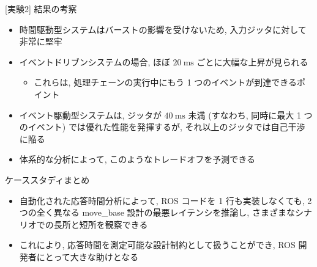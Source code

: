 \begin{frame}{[実験2] 結果の考察}
    \begin{itemize}
        \item 時間駆動型システムはバーストの影響を受けないため, 入力ジッタに対して非常に堅牢
        \item イベントドリブンシステムの場合, ほぼ $20 \mathrm{~ms}$ ごとに大幅な上昇が見られる
              \begin{itemize}
                  \item これらは, 処理チェーンの実行中にもう 1 つのイベントが到達できるポイント
              \end{itemize}
        \item イベント駆動型システムは, ジッタが $40 \mathrm{~ms}$ 未満 (すなわち, 同時に最大 1 つのイベント) では優れた性能を発揮するが, それ以上のジッタでは自己干渉に陥る
        \item 体系的な分析によって, このようなトレードオフを予測できる
    \end{itemize}
\end{frame}

\begin{frame}{ケーススタディまとめ}
    \begin{itemize}
        \item 自動化された応答時間分析によって, ROS コードを 1 行も実装しなくても, 2 つの全く異なる move\_base 設計の最悪レイテンシを推論し, さまざまなシナリオでの長所と短所を観察できる
        \item これにより, 応答時間を測定可能な設計制約として扱うことができ, ROS 開発者にとって大きな助けとなる
    \end{itemize}
\end{frame}
